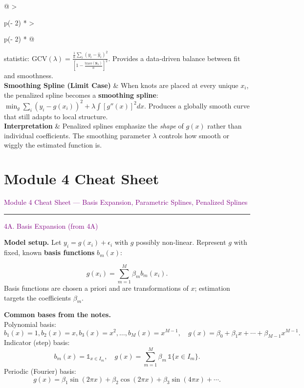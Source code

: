 \documentclass[
  letterpaper,
  DIV=11,
  numbers=noendperiod]{scrreprt}
\begin{document}
\begin{longtable}[]{@{}
  >{\raggedright\arraybackslash}p{(\columnwidth - 2\tabcolsep) * }
  >{\raggedright\arraybackslash}p{(\columnwidth - 2\tabcolsep) * }@{}}
statistic:
\(\text{GCV}(\lambda) = \frac{\frac{1}{n}\sum_i (y_i - \hat{y}_i)^2}{\left[1 - \frac{\text{trace}(\mathbf{S}_\lambda)}{n}\right]^2}.\)
Provides a data-driven balance between fit and smoothness. \\
\textbf{Smoothing Spline (Limit Case)} & When knots are placed at every
unique \(x_i\), the penalized spline becomes a \textbf{smoothing
spline}:
\(\min_g \sum_i (y_i - g(x_i))^2 + \lambda \int [g''(x)]^2 dx.\)
Produces a globally smooth curve that still adapts to local
structure. \\
\textbf{Interpretation} & Penalized splines emphasize the \emph{shape}
of \(g(x)\) rather than individual coefficients. The smoothing parameter
\(\lambda\) controls how smooth or wiggly the estimated function is. \\
\end{longtable}


\hypertarget{module-4-cheat-sheet}{%
\chapter*{Module 4 Cheat Sheet}\label{module-4-cheat-sheet}}


\textcolor{purple}{Module 4 Cheat Sheet — Basis Expansion, Parametric Splines, Penalized Splines}

\begin{center}\rule{0.5\linewidth}{0.5pt}\end{center}

\textcolor{purple}{4A. Basis Expansion (from 4A)}

\textbf{Model setup.} Let \(y_i = g(x_i) + \epsilon_i\) with \(g\)
possibly non-linear. Represent \(g\) with fixed, known \textbf{basis
functions} \(b_m(x)\):

\[
g(x_i) = \sum_{m=1}^M \beta_m b_m(x_i).
\] Basis functions are chosen a priori and are transformations of \(x\);
estimation targets the coefficients \(\beta_m\).

\textbf{Common bases from the notes.}\\
Polynomial basis: \[
b_1(x)=1, b_2(x)=x, b_3(x)=x^2, \ldots, b_M(x)=x^{M-1},\quad
g(x)=\beta_0+\beta_1 x+\cdots+\beta_{M-1}x^{M-1}.
\] Indicator (step) basis: \[
b_m(x)=\mathbb{1}_{x\in I_m},\quad g(x)=\sum_{m=1}^M \beta_m\,\mathbb{1}\{x\in I_m\}.
\] Periodic (Fourier) basis: \[
g(x)=\beta_1\sin(2\pi x)+\beta_2\cos(2\pi x)+\beta_3\sin(4\pi x)+\cdots.
\]
\end{document}
